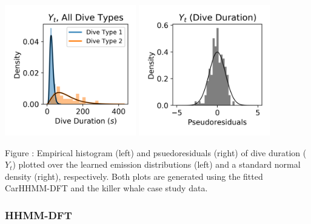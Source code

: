 \documentclass{article}
\begin{document}
        \begin{center}
        \includegraphics[width=2.25in]{../Plots/CarHHMM2_empirical_hist_dive_duration.png}
        \includegraphics[width=2.25in]{../Plots/CarHHMM2_psedoresids_Dive_Duration.png}
        \end{center}
        
        \noindent Figure : Empirical histogram (left) and psuedoresiduals (right) of dive duration ($Y_{t}$) plotted over the learned emission distributions (left) and a standard normal density (right), respectively. Both plots are generated using the fitted CarHHMM-DFT and the killer whale case study data.
        \addtocounter{fignum}{1}
        
        \subsubsection{HHMM-DFT}
        
\end{document}

